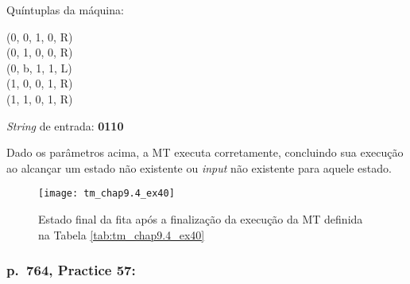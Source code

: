 \begin{table}[H]
    \begin{minipage}{0.666\linewidth}

        \begin{minipage}{.5\linewidth}
            Quíntuplas da máquina:
        \end{minipage}%
        \begin{minipage}{.5\linewidth}
            \ttfamily
            (0, 0, 1, 0, R) \\
            (0, 1, 0, 0, R) \\
            (0, b, 1, 1, L) \\
            (1, 0, 0, 1, R) \\
            (1, 1, 0, 1, R)
        \end{minipage}

    \end{minipage}%
    \begin{minipage}{0.333\linewidth}

       \begin{flushright}
            \textit{String} de entrada: \textbf{0110}
       \end{flushright}

    \end{minipage}

    \caption{\cite[p.\ 762, Example 40]{judith}}
    \label{tab:tm_chap9.4_ex40}
\end{table}

\noindent
Dado os parâmetros acima, a MT executa corretamente, concluindo sua execução ao
alcançar um estado não existente ou \textit{input} não existente para aquele
estado.

\begin{figure}[H]
    \centering
    \texttt{[image: tm\_chap9.4\_ex40]}
    \caption{
        Estado final da fita após a finalização da execução da MT definida na
        Tabela \ref{tab:tm_chap9.4_ex40}
    }
    \label{fig:tm_chap9.4_ex40}
\end{figure}

\subsubsection*{p.\ 764, Practice 57:}

